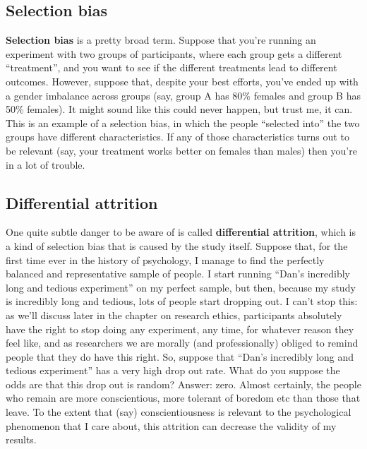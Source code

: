 \documentclass[]{book}
\begin{document}
\hypertarget{selection-bias}{%
\subsection{Selection bias}\label{selection-bias}}

\textbf{Selection bias} is a pretty broad term. Suppose that you're running an experiment with two groups of participants, where each group gets a different ``treatment'', and you want to see if the different treatments lead to different outcomes. However, suppose that, despite your best efforts, you've ended up with a gender imbalance across groups (say, group A has 80\% females and group B has 50\% females). It might sound like this could never happen, but trust me, it can. This is an example of a selection bias, in which the people ``selected into'' the two groups have different characteristics. If any of those characteristics turns out to be relevant (say, your treatment works better on females than males) then you're in a lot of trouble.

\hypertarget{differential-attrition}{%
\subsection{Differential attrition}\label{differential-attrition}}

One quite subtle danger to be aware of is called \textbf{differential attrition}, which is a kind of selection bias that is caused by the study itself. Suppose that, for the first time ever in the history of psychology, I manage to find the perfectly balanced and representative sample of people. I start running ``Dan's incredibly long and tedious experiment'' on my perfect sample, but then, because my study is incredibly long and tedious, lots of people start dropping out. I can't stop this: as we'll discuss later in the chapter on research ethics, participants absolutely have the right to stop doing any experiment, any time, for whatever reason they feel like, and as researchers we are morally (and professionally) obliged to remind people that they do have this right. So, suppose that ``Dan's incredibly long and tedious experiment'' has a very high drop out rate. What do you suppose the odds are that this drop out is random? Answer: zero. Almost certainly, the people who remain are more conscientious, more tolerant of boredom etc than those that leave. To the extent that (say) conscientiousness is relevant to the psychological phenomenon that I care about, this attrition can decrease the validity of my results.
\end{document}
